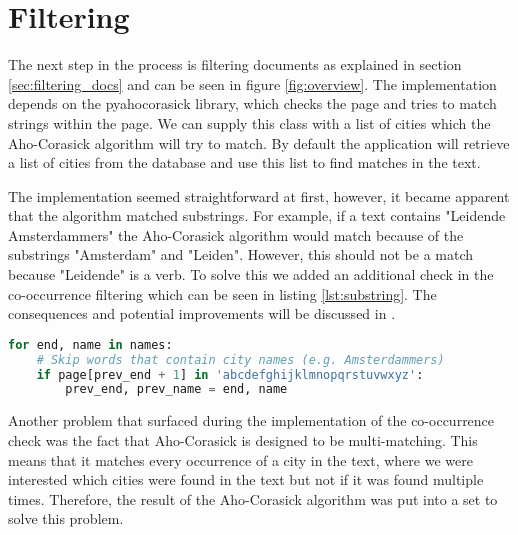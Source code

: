 \section{Filtering}\label{sec:5-filtering}
The next step in the process is filtering documents as explained in section \ref{sec:filtering_docs} and can be seen in figure \ref{fig:overview}. The implementation depends on the pyahocorasick library, which checks the page and tries to match strings within the page. We can supply this class with a list of cities which the Aho-Corasick algorithm will try to match. By default the application will retrieve a list of cities from the database and use this list to find matches in the text.

The implementation seemed straightforward at first, however, it became apparent that the algorithm matched substrings. For example, if a text contains "Leidende Amsterdammers" the Aho-Corasick algorithm would match because of the substrings "Amsterdam" and "Leiden". However, this should not be a match because "Leidende" is a verb. To solve this we added an additional check in the co-occurrence filtering which can be seen in listing \ref{lst:substring}. The consequences and potential improvements will be discussed in .

\begin{lstlisting}[language=Python, caption=Additional check to prevent substring matches, label={lst:substring}]
for end, name in names:
    # Skip words that contain city names (e.g. Amsterdammers)
    if page[prev_end + 1] in 'abcdefghijklmnopqrstuvwxyz':
        prev_end, prev_name = end, name
\end{lstlisting}

Another problem that surfaced during the implementation of the co-occurrence check was the fact that Aho-Corasick is designed to be multi-matching. This means that it matches every occurrence of a city in the text, where we were interested which cities were found in the text but not if it was found multiple times. Therefore, the result of the Aho-Corasick algorithm was put into a set to solve this problem.
